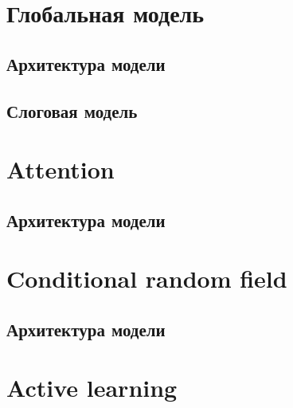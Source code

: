 \documentclass[14pt, a4paper, russian]{report}
\newtheorem{definition}{\indent Определение}
\begin{document}
\begin{normalsize}
\section{Глобальная модель}
\subsection{Архитектура модели}

\subsection{Слоговая модель}
\section{Attention}
\subsection{Архитектура модели}


\section{Conditional random field}
\subsection{Архитектура модели}


\section{Active learning}




\end{normalsize}
\end{document}
